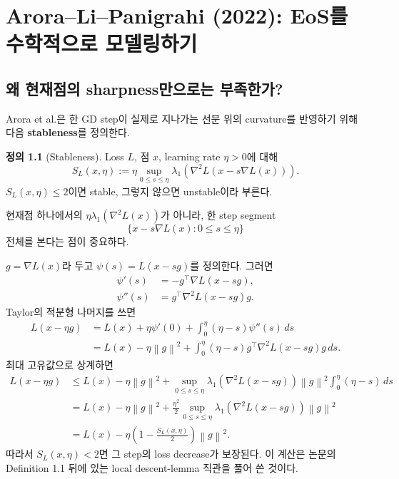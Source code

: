 \documentclass[11pt,a4paper,oneside,openany]{memoir}
\newcommand{\grad}{\nabla}
\newcommand{\Hess}{\nabla^2}
\newcommand{\norm}[1]{\left\lVert #1\right\rVert}
\theoremstyle{definition}
\newtheorem{definition}{정의}[chapter]
\begin{document}
\chapter{Arora--Li--Panigrahi (2022): EoS를 수학적으로 모델링하기}

\section{왜 현재점의 sharpness만으로는 부족한가?}

Arora et al.은 한 GD step이 실제로 지나가는 선분 위의 curvature를 반영하기 위해
다음 \textbf{stableness}를 정의한다.

\begin{definition}[Stableness]
Loss $L$, 점 $x$, learning rate $\eta>0$에 대해
\begin{equation}
  S_L(x,\eta)
  :=\eta\sup_{0\le s\le\eta}
  \lambda_1\!\left(\Hess L(x-s\grad L(x))\right).
  \label{eq:stableness}
\end{equation}
$S_L(x,\eta)\le2$이면 stable, 그렇지 않으면 unstable이라 부른다.
\end{definition}

현재점 하나에서의 $\eta\lambda_1(\Hess L(x))$가 아니라,
한 step segment
\begin{equation}
  \{x-s\grad L(x):0\le s\le\eta\}
\end{equation}
전체를 본다는 점이 중요하다.

\begin{suppbox}
$g=\grad L(x)$라 두고 $\psi(s)=L(x-sg)$를 정의한다. 그러면
\begin{align}
  \psi'(s)&=-g^\top\grad L(x-sg),\\
  \psi''(s)&=g^\top\Hess L(x-sg)g.
\end{align}
Taylor의 적분형 나머지를 쓰면
\begin{align}
  L(x-\eta g)
  &=L(x)+\eta\psi'(0)+\int_0^\eta(\eta-s)\psi''(s)\,ds\\
  &=L(x)-\eta\norm g^2
  +\int_0^\eta(\eta-s)
  g^\top\Hess L(x-sg)g\,ds.
\end{align}
최대 고유값으로 상계하면
\begin{align}
  L(x-\eta g)
  &\le L(x)-\eta\norm g^2
  +\sup_{0\le s\le\eta}\lambda_1(\Hess L(x-sg))
  \norm g^2\int_0^\eta(\eta-s)\,ds\\
  &=L(x)-\eta\norm g^2
  +\frac{\eta^2}{2}
  \sup_{0\le s\le\eta}\lambda_1(\Hess L(x-sg))\norm g^2\\
  &=L(x)-\eta\left(1-\frac{S_L(x,\eta)}{2}\right)\norm g^2.
\end{align}
따라서 $S_L(x,\eta)<2$면 그 step의 loss decrease가 보장된다.
이 계산은 논문의 Definition 1.1 뒤에 있는 local descent-lemma 직관을 풀어 쓴 것이다.
\end{suppbox}
\end{document}
